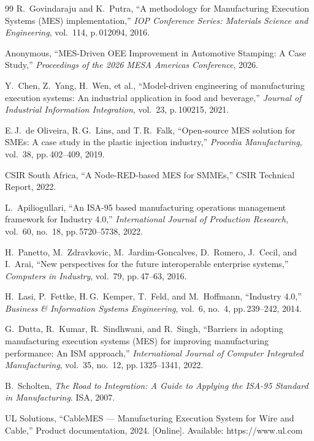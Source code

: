 \documentclass[11pt]{article}
\begin{document}
\begin{thebibliography}{99}
 R.\ Govindaraju and K.\ Putra, ``A methodology for Manufacturing Execution Systems (MES) implementation,'' \textit{IOP Conference Series: Materials Science and Engineering}, vol.~114, p.\,012094, 2016.

 Anonymous, ``MES-Driven OEE Improvement in Automotive Stamping: A Case Study,'' \textit{Proceedings of the 2026 MESA Americas Conference}, 2026.

 Y.\ Chen, Z.\ Yang, H.\ Wen, et al., ``Model-driven engineering of manufacturing execution systems: An industrial application in food and beverage,'' \textit{Journal of Industrial Information Integration}, vol.~23, p.\,100215, 2021.

 E.\,J.\ de Oliveira, R.\,G.\ Lins, and T.\,R.\ Falk, ``Open-source MES solution for SMEs: A case study in the plastic injection industry,'' \textit{Procedia Manufacturing}, vol.~38, pp.\,402--409, 2019.

 CSIR South Africa, ``A Node-RED-based MES for SMMEs,'' CSIR Technical Report, 2022.

 L.\ Apiliogullari, ``An ISA-95 based manufacturing operations management framework for Industry 4.0,'' \textit{International Journal of Production Research}, vol.~60, no.~18, pp.\,5720--5738, 2022.

 H.\ Panetto, M.\ Zdravkovic, M.\ Jardim-Goncalves, D.\ Romero, J.\ Cecil, and I.\ Arai, ``New perspectives for the future interoperable enterprise systems,'' \textit{Computers in Industry}, vol.~79, pp.\,47--63, 2016.

 H.\ Lasi, P.\ Fettke, H.\,G.\ Kemper, T.\ Feld, and M.\ Hoffmann, ``Industry 4.0,'' \textit{Business \& Information Systems Engineering}, vol.~6, no.~4, pp.\,239--242, 2014.

 G.\ Dutta, R.\ Kumar, R.\ Sindhwani, and R.\ Singh, ``Barriers in adopting manufacturing execution systems (MES) for improving manufacturing performance: An ISM approach,'' \textit{International Journal of Computer Integrated Manufacturing}, vol.~35, no.~12, pp.\,1325--1341, 2022.

 B.\ Scholten, \textit{The Road to Integration: A Guide to Applying the ISA-95 Standard in Manufacturing}. ISA, 2007.

 UL Solutions, ``CableMES --- Manufacturing Execution System for Wire and Cable,'' Product documentation, 2024. [Online]. Available: https://www.ul.com


\end{thebibliography}
\end{document}
